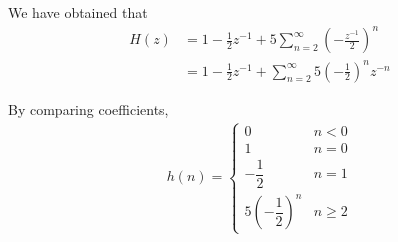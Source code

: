 \documentclass[journal,12pt,twocolumn]{IEEEtran}
\providecommand{\brak}[1]{\ensuremath{\left(#1\right)}}
\providecommand{\ztrans}{\overset{\mathcal{Z}}{ \rightleftharpoons}}
\numberwithin{equation}{section}
\renewcommand\thesection{\arabic{section}}
\begin{document}
\begin{enumerate}[label=\thesection.\arabic*]
	We have obtained that
	\begin{align}
		H(z) &= 1 - \frac12 z^{-1} + 5\sum_{n=2}^\infty \brak{-\frac{z^{-1}}{2}}^n \\
		&= 1 - \frac12 z^{-1} + \sum_{n=2}^\infty 5\brak{-\frac{1}{2}}^n z^{-n}
	\end{align}
	
	By comparing coefficients,
	\begin{align}
		h(n) = 
		\begin{cases}
			0 & n < 0 \\
			1 & n = 0 \\
			-\dfrac{1}{2} & n = 1 \\
			5\brak{-\dfrac{1}{2}}^n & n \ge 2
		\end{cases}
 	\end{align}

\end{enumerate}
\end{document}
